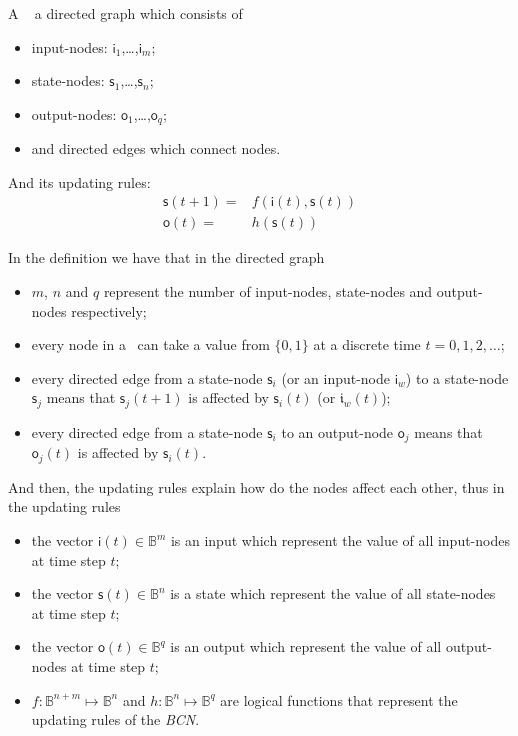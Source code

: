 \begin{definition} A \BCN\ %
	a directed graph which consists of 
	\begin{itemize}
	\item input-nodes: {$\mathsf{i}_1$,\ldots ,$\mathsf{i}_m$};
	\item state-nodes: {$\mathsf{s}_1$,\ldots ,$\mathsf{s}_n$};
	\item output-nodes: {$\mathsf{o}_1$,\ldots ,$\mathsf{o}_q$};
	\item and directed edges which connect nodes. 
\end{itemize}
	
And its updating rules:
\begin{equation}
\begin{split}
\mathsf{s}(t+1)=&f(\mathsf{i}(t),\mathsf{s}(t))\\
\mathsf{o}(t)=&h(\mathsf{s}(t))
\end{split}
\label{equ:1}
\end{equation}

 \end{definition}
In the definition we have that in the directed graph
\begin{itemize}
	\item $m$, $n$ and $q$ represent the number of input-nodes, state-nodes and output-nodes respectively;
          \item every node in a \BCN\ can take a value from $\{0,1\}$ at a discrete time $t=0, 1, 2,\ldots$;
	\item every directed edge from a state-node $\mathsf{s}_i$ (or an input-node $\mathsf{i}_w$) to a state-node $\mathsf{s}_j$ means that  $\mathsf{s}_j(t+1)$ is affected by $\mathsf{s}_i(t)$ (or $\mathfrak{i}_w(t)$);	
	\item every directed edge from a state-node $\mathsf{s}_i$ to an output-node $\mathsf{o}_j$ means that   $\mathsf{o}_j(t)$  is affected by $\mathsf{s}_i(t)$.  
	\end{itemize}
And then, the updating rules explain how do the nodes affect each other, thus in the updating rules
	\begin{itemize}
	\item the vector $\mathsf{i}(t)\in \mathbb{B}^m$ is an input which represent the value of all input-nodes at time step $t$; 	
	\item the vector $\mathsf{s}(t)\in \mathbb{B}^n$ is a state which represent the value of all state-nodes at time step $t$; 	
	\item the vector $\mathsf{o}(t)\in \mathbb{B}^q$ is an output which represent the value of all output-nodes at time step $t$;  
	\item $f:\mathbb{B}^{n+m}\mapsto \mathbb{B}^n$ and $h:\mathbb{B}^n\mapsto \mathbb{B}^q$ are logical functions that represent the updating rules of the {\em BCN}. 
	
\end{itemize}

